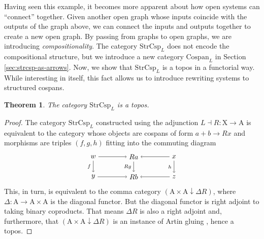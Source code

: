 \documentclass{amsart}
\newcommand{\A}{\cat{A}}
\newcommand{\X}{\cat{X}}
\newcommand{\Csp}{\cat{Cospan}}
\newcommand{\StrCsp}{\cat{StrCsp}}
\newcommand{\cat}[1]{\mathrm{#1}}
\newcommand{\from}{\colon}
\newcommand{\csp}[3]{#1 + #3 \to #2}
\newtheorem{theorem}{Theorem}[section]
\theoremstyle{remark}
\theoremstyle{definition}
\begin{document}

Having seen this example, it becomes more apparent about how open
systems can ``connect'' together. Given another open graph whose
inputs coincide with the outputs of the graph above, we can connect
the inputs and outputs together to create a new open graph. By passing
from graphs to open graphs, we are introducing
\emph{compositionality}. The category $ \StrCsp_{L} $ does not encode
the compositional structure, but we introduce a new category
$ \Csp_L $ in Section \ref{sec:strcsp-as-arrows}. Now, we show that
$ \StrCsp_L $ is a topos in a functorial way.  While interesting in
itself, this fact allows us to introduce rewriting systems to
structured cospans.

\begin{theorem}
\label{thm:strcsp-istopos}
  The category $ \StrCsp_L $ is a topos.
\end{theorem}

\begin{proof}
  The category $ \StrCsp_L $ constructed using the adjunction
  $ L \dashv R \from \X \to \A $ is equivalent to the category
  whose objects are cospans of form
  \(
    \csp{a}{Rx}{b}
  \)
  and morphisms are triples $ ( f,g,h ) $ fitting into the commuting
  diagram
  \[
    \begin{tikzpicture}
      \node (1) at (-2,1) {\( w \)};
      \node (2) at (0,1) {\( Ra \)};
      \node (3) at (2,1) {\( x \)};
      \node (4) at (-2,0) {\( y \)};
      \node (5) at (0,0) {\( Rb \)};
      \node (6) at (2,0) {\( z \)};
      \draw [->] (1) to  node [] {\scriptsize{\(  \)}} (2);
      \draw [->] (3) to node [] {\scriptsize{\(  \)}} (2);
      \draw [->] (4) to node [] {\scriptsize{\(  \)}} (5);
      \draw [->] (6) to node [] {\scriptsize{\(  \)}} (5);
      \draw [->] (1) to node [left] {\scriptsize{\( f \)}} (4);
      \draw [->] (2) to node [left] {\scriptsize{\( Rg \)}} (5);
      \draw [->] (3) to node [left] {\scriptsize{\( h \)}} (6); 
    \end{tikzpicture}
  \]
  This, in turn, is equivalent to the comma category
  $ ( \A \times \A \downarrow \Delta R ) $, where
  $ \Delta \from \A \to \A \times \A $ is the diagonal functor. But
  the diagonal functor is right adjoint to taking binary
  coproducts. That means $ \Delta R $ is also a right adjoint and,
  furthermore, that $ ( \A \times \A \downarrow \Delta R ) $ is an
  instance of Artin gluing \cite{Wraith_ArtinGlue}, hence a topos.
\end{proof}
\end{document}
